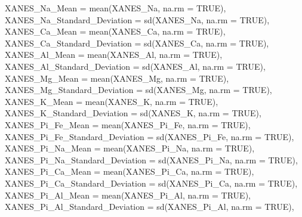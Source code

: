 \documentclass[
]{article}
\newenvironment{Shaded}{\begin{snugshade}}{\end{snugshade}}
\newcommand{\AttributeTok}[1]{\textcolor[rgb]{0.77,0.63,0.00}{#1}}
\newcommand{\ConstantTok}[1]{\textcolor[rgb]{0.00,0.00,0.00}{#1}}
\newcommand{\FunctionTok}[1]{\textcolor[rgb]{0.00,0.00,0.00}{#1}}
\newcommand{\NormalTok}[1]{#1}
\begin{document}
\begin{Shaded}
\begin{Highlighting}[]
    \AttributeTok{XANES\_Na\_Mean =} \FunctionTok{mean}\NormalTok{(XANES\_Na, }\AttributeTok{na.rm =} \ConstantTok{TRUE}\NormalTok{),}
    \AttributeTok{XANES\_Na\_Standard\_Deviation =} \FunctionTok{sd}\NormalTok{(XANES\_Na, }\AttributeTok{na.rm =} \ConstantTok{TRUE}\NormalTok{),}
    \AttributeTok{XANES\_Ca\_Mean =} \FunctionTok{mean}\NormalTok{(XANES\_Ca, }\AttributeTok{na.rm =} \ConstantTok{TRUE}\NormalTok{),}
    \AttributeTok{XANES\_Ca\_Standard\_Deviation =} \FunctionTok{sd}\NormalTok{(XANES\_Ca, }\AttributeTok{na.rm =} \ConstantTok{TRUE}\NormalTok{),}
    \AttributeTok{XANES\_Al\_Mean =} \FunctionTok{mean}\NormalTok{(XANES\_Al, }\AttributeTok{na.rm =} \ConstantTok{TRUE}\NormalTok{),}
    \AttributeTok{XANES\_Al\_Standard\_Deviation =} \FunctionTok{sd}\NormalTok{(XANES\_Al, }\AttributeTok{na.rm =} \ConstantTok{TRUE}\NormalTok{),}
    \AttributeTok{XANES\_Mg\_Mean =} \FunctionTok{mean}\NormalTok{(XANES\_Mg, }\AttributeTok{na.rm =} \ConstantTok{TRUE}\NormalTok{),}
    \AttributeTok{XANES\_Mg\_Standard\_Deviation =} \FunctionTok{sd}\NormalTok{(XANES\_Mg, }\AttributeTok{na.rm =} \ConstantTok{TRUE}\NormalTok{),}
    \AttributeTok{XANES\_K\_Mean =} \FunctionTok{mean}\NormalTok{(XANES\_K, }\AttributeTok{na.rm =} \ConstantTok{TRUE}\NormalTok{),}
    \AttributeTok{XANES\_K\_Standard\_Deviation =} \FunctionTok{sd}\NormalTok{(XANES\_K, }\AttributeTok{na.rm =} \ConstantTok{TRUE}\NormalTok{),}
    \AttributeTok{XANES\_Pi\_Fe\_Mean =} \FunctionTok{mean}\NormalTok{(XANES\_Pi\_Fe, }\AttributeTok{na.rm =} \ConstantTok{TRUE}\NormalTok{),}
    \AttributeTok{XANES\_Pi\_Fe\_Standard\_Deviation =} \FunctionTok{sd}\NormalTok{(XANES\_Pi\_Fe, }\AttributeTok{na.rm =} \ConstantTok{TRUE}\NormalTok{),}
    \AttributeTok{XANES\_Pi\_Na\_Mean =} \FunctionTok{mean}\NormalTok{(XANES\_Pi\_Na, }\AttributeTok{na.rm =} \ConstantTok{TRUE}\NormalTok{),}
    \AttributeTok{XANES\_Pi\_Na\_Standard\_Deviation =} \FunctionTok{sd}\NormalTok{(XANES\_Pi\_Na, }\AttributeTok{na.rm =} \ConstantTok{TRUE}\NormalTok{),}
    \AttributeTok{XANES\_Pi\_Ca\_Mean =} \FunctionTok{mean}\NormalTok{(XANES\_Pi\_Ca, }\AttributeTok{na.rm =} \ConstantTok{TRUE}\NormalTok{),}
    \AttributeTok{XANES\_Pi\_Ca\_Standard\_Deviation =} \FunctionTok{sd}\NormalTok{(XANES\_Pi\_Ca, }\AttributeTok{na.rm =} \ConstantTok{TRUE}\NormalTok{),}
    \AttributeTok{XANES\_Pi\_Al\_Mean =} \FunctionTok{mean}\NormalTok{(XANES\_Pi\_Al, }\AttributeTok{na.rm =} \ConstantTok{TRUE}\NormalTok{),}
    \AttributeTok{XANES\_Pi\_Al\_Standard\_Deviation =} \FunctionTok{sd}\NormalTok{(XANES\_Pi\_Al, }\AttributeTok{na.rm =} \ConstantTok{TRUE}\NormalTok{),}

\end{Highlighting}
\end{Shaded}
\end{document}
